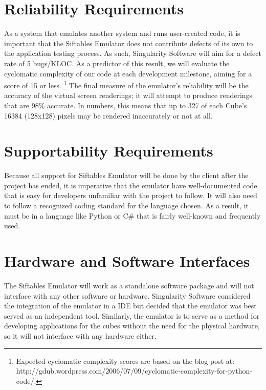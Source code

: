 \documentclass[12pt]{article}
\begin{document}
\section{Reliability Requirements}
As a system that emulates another system and runs user-created code, it is important that the Siftables Emulator does not contribute defects of its own to the application testing process. As such, Singularity Software will aim for a defect rate of 5 bugs/KLOC. As a predictor of this result, we will evaluate the cyclomatic complexity of our code at each development milestone, aiming for a score of 15 or less. \footnote{Expected cyclomatic complexity scores are based on the blog post at: http://gdub.wordpress.com/2006/07/09/cyclomatic-complexity-for-python-code/.} The final measure of the emulator's reliability will be the accuracy of the virtual screen renderings; it will attempt to produce renderings that are 98\% accurate. In numbers, this means that up to 327 of each Cube's 16384 (128x128) pixels may be rendered inaccurately or not at all.

\section{Supportability Requirements}
Because all support for Siftables Emulator will be done by the client after the project has ended, it is imperative that the emulator have well-documented code that is easy for developers unfamiliar with the project to follow. It will also need to follow a recognized coding standard for the language chosen. As a result, it must be in a language like Python or C\# that is fairly well-known and frequently used.

\section{Hardware and Software Interfaces}
The Siftables Emulator will work as a standalone software package and will not interface with any other software or hardware. Singularity Software considered the integration of the emulator in a \gls{IDE} but decided that the emulator was best served as an independent tool. Similarly, the emulator is to serve as a method for developing applications for the cubes without the need for the physical hardware, so it will not interface with any hardware either.
\end{document}
